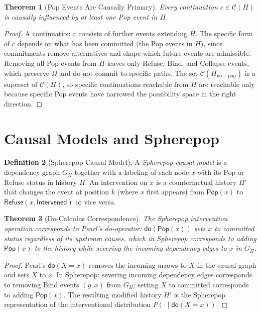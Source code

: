 \documentclass[12pt, a4paper, openany]{book}
\theoremstyle{plain}
\newtheorem{theorem}{Theorem}[chapter]
\theoremstyle{definition}
\newtheorem{definition}[theorem]{Definition}
\theoremstyle{remark}
\newcommand{\Pop}{\mathsf{Pop}}
\newcommand{\Refuse}{\mathsf{Refuse}}
\newcommand{\calC}{\mathcal{C}}
\begin{document}
\begin{theorem}[Pop Events Are Causally Primary]
Every continuation $c \in \calC(H)$ is causally influenced by at least one
Pop event in $H$.
\end{theorem}

\begin{proof}
A continuation $c$ consists of further events extending $H$. The specific
form of $c$ depends on what has been committed (the Pop events in $H$),
since commitments remove alternatives and shape which future events are
admissible. Removing all Pop events from $H$ leaves only Refuse, Bind, and
Collapse events, which preserve $\Omega$ and do not commit to specific paths.
The set $\calC(H_{\mathrm{no-pop}})$ is a superset of $\calC(H)$, so specific
continuations reachable from $H$ are reachable only because specific Pop events
have narrowed the possibility space in the right direction.
\end{proof}

\section{Causal Models and Spherepop}

\begin{definition}[Spherepop Causal Model]
A \emph{Spherepop causal model} is a dependency graph $G_H$ together with
a labeling of each node $x$ with its Pop or Refuse status in history $H$.
An intervention on $x$ is a counterfactual history $H'$ that changes the
event at position $k$ (where $x$ first appears) from $\Pop(x)$ to
$\Refuse(x, \mathsf{Intervened})$ or vice versa.
\end{definition}

\begin{theorem}[Do-Calculus Correspondence]
The Spherepop intervention operation corresponds to Pearl's do-operator:
$\mathsf{do}(\Pop(x))$ sets $x$ to committed status regardless of its upstream
causes, which in Spherepop corresponds to adding $\Pop(x)$ to the history while
severing the incoming dependency edges to $x$ in $G_H$.
\end{theorem}

\begin{proof}
Pearl's $\mathsf{do}(X = x)$ removes the incoming arrows to $X$ in the causal
graph and sets $X$ to $x$. In Spherepop: severing incoming dependency edges
corresponds to removing Bind events $(y, x)$ from $G_H$; setting $X$ to
committed corresponds to adding $\Pop(x)$. The resulting modified history
$H'$ is the Spherepop representation of the interventional distribution
$P(\cdot \mid \mathsf{do}(X = x))$.
\end{proof}
\end{document}
